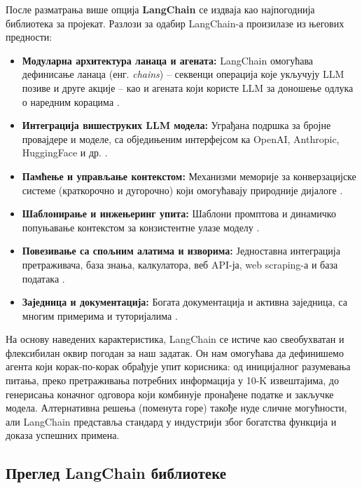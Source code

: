 После разматрања више опција \textbf{LangChain} се издваја као најпогоднија библиотека за пројекат. Разлози за одабир LangChain-а произилазе из његових предности:
\newline

\begin{itemize}
    \item \textbf{Модуларна архитектура ланаца и агената:} LangChain омогућава дефинисање ланаца (енг. \textit{chains}) -- секвенци операција које укључују LLM позиве и друге акције -- као и агената који користе LLM за доношење одлука о наредним корацима \cite{patriwala_langchain_2025}.
    \item \textbf{Интеграција вишеструких LLM модела:} Уграђана подршка за бројне провајдере и моделе, са обједињеним интерфејсом ка OpenAI, Anthropic, HuggingFace и др. \cite{ibm_what_is_langchain_2023,patriwala_langchain_2025}.
    \item \textbf{Памћење и управљање контекстом:} Механизми меморије за конверзацијске системе (краткорочно и дугорочно) који омогућавају природније дијалоге \cite{patriwala_langchain_2025}.
    \item \textbf{Шаблонирање и инжењеринг упита:} Шаблони промптова и динамичко попуњавање контекстом за конзистентне улазе моделу \cite{patriwala_langchain_2025}.
    \item \textbf{Повезивање са спољним алатима и изворима:} Једноставна интеграција претраживача, база знања, калкулатора, веб API-ја, web scraping-а и база података \cite{ibm_what_is_langchain_2023,patriwala_langchain_2025}.
    \item \textbf{Заједница и документација:} Богата документација и активна заједница, са многим примерима и туторијалима \cite{ibm_what_is_langchain_2023,patriwala_langchain_2025}.
\end{itemize}

На основу наведених карактеристика, LangChain се истиче као свеобухватан и флексибилан оквир погодан за наш задатак. Он нам омогућава да дефинишемо агента који корак-по-корак обрађује упит корисника: од иницијалног разумевања питања, преко претраживања потребних информација у 10-K извештајима, до генерисања коначног одговора који комбинује пронађене податке и закључке модела. Алтернативна решења (поменута горе) такође нуде сличне могућности, али LangChain представља стандард у индустрији због богатства функција и доказа успешних примена.

\subsection{Преглед LangChain библиотеке}

